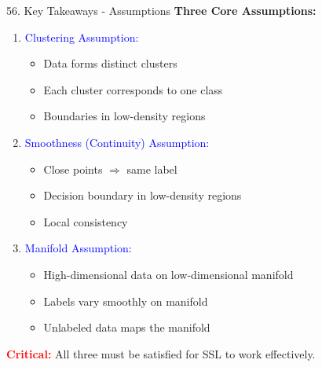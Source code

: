 \documentclass[8pt]{beamer}
\begin{document}
	\begin{frame}{56. Key Takeaways - Assumptions}
		\fontsize{6.5}{7.5}\selectfont
		\textbf{Three Core Assumptions:}
		
		\begin{enumerate}
			\item \textcolor{blue}{Clustering Assumption:}
			\begin{itemize}
				\item Data forms distinct clusters
				\item Each cluster corresponds to one class
				\item Boundaries in low-density regions
			\end{itemize}
			
			\item \textcolor{blue}{Smoothness (Continuity) Assumption:}
			\begin{itemize}
				\item Close points $\Rightarrow$ same label
				\item Decision boundary in low-density regions
				\item Local consistency
			\end{itemize}
			
			\item \textcolor{blue}{Manifold Assumption:}
			\begin{itemize}
				\item High-dimensional data on low-dimensional manifold
				\item Labels vary smoothly on manifold
				\item Unlabeled data maps the manifold
			\end{itemize}
		\end{enumerate}
		
		\textcolor{red}{\textbf{Critical:}} All three must be satisfied for SSL to work effectively.
	\end{frame}
	
\end{document}
